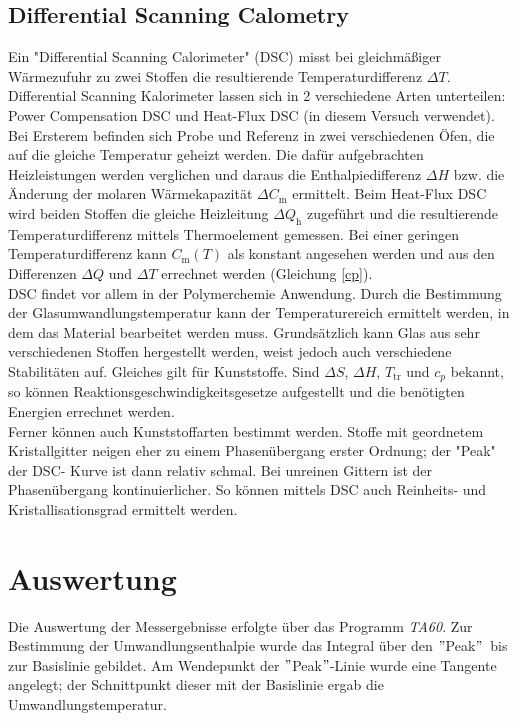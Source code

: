 \documentclass[12pt,a4paper,titlepage,headinclude,bibtotoc]{scrartcl}
\begin{document}
\subsection{Differential Scanning Calometry}
Ein "Differential Scanning Calorimeter" (DSC) misst bei gleichmäßiger Wärmezufuhr zu zwei Stoffen die resultierende Temperaturdifferenz $\Delta T$.
Differential Scanning Kalorimeter lassen sich in 2 verschiedene Arten unterteilen: Power Compensation DSC und Heat-Flux DSC (in diesem Versuch verwendet). Bei Ersterem befinden sich Probe und Referenz in zwei verschiedenen Öfen, die auf die gleiche Temperatur geheizt werden. Die dafür aufgebrachten Heizleistungen werden verglichen und daraus die Enthalpiedifferenz $\Delta H$ bzw. die Änderung der molaren Wärmekapazität $\Delta C_\mathrm{m}$ ermittelt.
Beim Heat-Flux DSC wird beiden Stoffen die gleiche Heizleitung $\Delta Q_\mathrm{h}$ zugeführt und die resultierende Temperaturdifferenz mittels Thermoelement gemessen.
Bei einer geringen Temperaturdifferenz kann $C_\mathrm{m}(T)$ als konstant angesehen werden und aus den Differenzen $\Delta Q$ und $\Delta T$ errechnet werden (Gleichung \ref{cp}).\\

DSC findet vor allem in der Polymerchemie Anwendung. Durch die Bestimmung der Glasumwandlungstemperatur kann der Temperaturereich ermittelt werden, in dem das Material bearbeitet werden muss. Grundsätzlich kann Glas aus sehr verschiedenen Stoffen hergestellt werden, weist jedoch auch verschiedene Stabilitäten auf. Gleiches gilt für Kunststoffe. 
Sind $\Delta S$, $\Delta H$, $T_\mathrm{tr}$ und $c_p$ bekannt, so können Reaktionsgeschwindigkeitsgesetze aufgestellt und die benötigten Energien errechnet werden.\\ 
Ferner können auch Kunststoffarten bestimmt werden.
Stoffe mit geordnetem Kristallgitter neigen eher zu einem Phasenübergang erster Ordnung; der "Peak" der DSC- Kurve ist dann relativ schmal. Bei unreinen Gittern ist der Phasenübergang  kontinuierlicher. So können mittels DSC auch Reinheits- und Kristallisationsgrad ermittelt werden.\\



\section{Auswertung}
Die Auswertung der Messergebnisse erfolgte über das Programm \textit{TA60}. Zur Bestimmung der Umwandlungsenthalpie wurde das Integral über den $"$Peak$"$\, bis zur Basislinie gebildet. Am Wendepunkt der $"$Peak$"$-Linie wurde eine Tangente angelegt; der Schnittpunkt dieser mit der Basislinie ergab die Umwandlungstemperatur.\\ 
\end{document}
